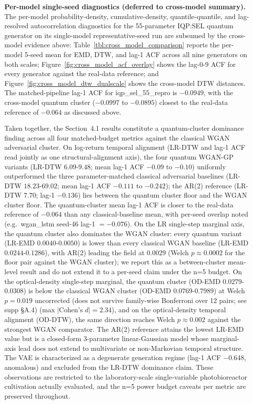 \documentclass[12pt,twocolumn]{article}
\begin{document}
\textbf{Per-model single-seed diagnostics (deferred to cross-model summary).}
The per-model probability-density, cumulative-density, quantile-quantile,
and lag-resolved autocorrelation diagnostics for the 55-parameter IQP:SEL
quantum generator on its single-model representative-seed run are
subsumed by the cross-model evidence above: Table~\ref{tbl:cross_model_comparison}
reports the per-model 5-seed mean for EMD, DTW, and lag-1 ACF across all
nine generators on both scales; Figure~\ref{fig:cross_model_acf_overlay}
shows the lag-0-9 ACF for every generator against the real-data reference;
and Figure~\ref{fig:cross_model_dtw_dualscale} shows the cross-model DTW
distances. The matched-pipeline lag-1 ACF for iqp\_sel\_55\_repro is
$-0.0949$, with the cross-model quantum cluster ($-0.0997$ to $-0.0895$)
closest to the real-data reference of $-0.064$ as discussed above.

Taken together, the Section~4.1 results constitute a quantum-cluster
dominance finding across all four matched-budget metrics against the
classical WGAN adversarial cluster.
On log-return temporal alignment (LR-DTW and lag-1 ACF read jointly as one
structural-alignment axis), the four quantum WGAN-GP variants
(LR-DTW $6.09$-$9.48$; mean lag-1 ACF $-0.09$ to $-0.10$) uniformly
outperformed the three parameter-matched classical adversarial baselines
(LR-DTW $18.23$-$69.02$; mean lag-1 ACF $-0.111$ to $-0.242$); the AR(2)
reference (LR-DTW $7.70$; lag-1 $-0.136$) lies between the quantum cluster
floor and the WGAN cluster floor. The quantum-cluster mean lag-1 ACF is
closer to the real-data reference of $-0.064$ than any classical-baseline
mean, with per-seed overlap noted (e.g.\ wgan\_lstm seed-46 lag-1 $=
-0.076$). On the LR single-step marginal axis, the quantum cluster also
dominates the WGAN cluster: every quantum variant (LR-EMD
$0.0040$-$0.0050$) is lower than every classical WGAN baseline (LR-EMD
$0.0244$-$0.1286$), with AR(2) leading the field at $0.0029$ (Welch $p
\approx 0.0002$ for the floor pair against the WGAN cluster); we report
this as a between-cluster mean-level result and do not extend it to a
per-seed claim under the n=5 budget. On the optical-density single-step
marginal, the quantum cluster (OD-EMD $0.0279$-$0.0308$) is below the
classical WGAN cluster (OD-EMD $0.0769$-$0.7989$) at Welch $p = 0.019$
uncorrected (does not survive family-wise Bonferroni over 12 pairs;
see supp \S A.4) (max $|\text{Cohen's } d| = 2.34$), and on the optical-density temporal
alignment (OD-DTW), the same direction reaches Welch $p \approx 0.002$
against the strongest WGAN comparator. The AR(2) reference attains the
lowest LR-EMD value but is a closed-form 3-parameter linear-Gaussian
model whose marginal-axis lead does not extend to multivariate or
non-Markovian temporal structure. The VAE is characterized as a
degenerate generation regime (lag-1 ACF $-0.648$, anomalous) and
excluded from the LR-DTW dominance claim. These observations are
restricted to the laboratory-scale single-variable photobioreactor
cultivation actually evaluated, and the n=5 power budget caveats per
metric are preserved throughout.
\end{document}
